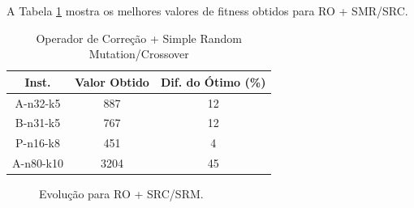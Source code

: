\documentclass[conference]{IEEEtran}
\begin{document}
A Tabela \ref{table_correction} mostra os melhores valores de fitness obtidos para RO + SMR/SRC.

\begin{table}[!t]
\renewcommand{\arraystretch}{1.3}
\centering
\caption{Operador de Correção + Simple Random Mutation/Crossover}
\label{table_correction}
\begin{tabular}{|c||c||c|}
\hline
Inst. & Valor Obtido & Dif. do Ótimo (\%)\\
\hline
A-n32-k5 & 887 & 12\\
B-n31-k5 & 767 & 12\\
P-n16-k8 & 451 & 4\\
A-n80-k10 & 3204 & 45\\
\hline
\end{tabular}
\end{table}

\begin{figure}[!t]
\centering
{}
\hfil
{}
\caption{Evolução para RO + SRC/SRM.}
\label{ro}
\end{figure}
\end{document}
